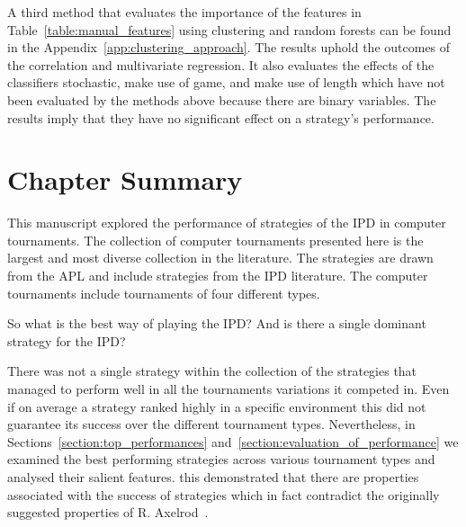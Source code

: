 A third method that evaluates the importance of the features in
Table~\ref{table:manual_features} using clustering and random forests can be found in
the Appendix~\ref{app:clustering_approach}. The results uphold the outcomes of the
correlation and multivariate regression. It also evaluates the effects
of the classifiers stochastic, make use of game, and make use of length which
have not been evaluated by the methods above because there are binary variables.
The results imply that they have no significant effect on a strategy's
performance. %

\section{Chapter Summary}\label{section:conclusion} %

This manuscript explored the performance of \numberofstrategies strategies of
the IPD in \numberofalltournaments computer tournaments. The collection of
computer tournaments presented here is the largest and most diverse collection in the
literature. The \numberofstrategies strategies are drawn from the APL and include
strategies from the IPD literature. The computer tournaments include tournaments of
four different types.

So what is the best way of playing the IPD? And is
there a single dominant strategy for the IPD? 

There was not a single strategy
within the collection of the \numberofstrategies strategies that managed to
perform well in all the tournaments variations it competed in. Even if on
average a strategy ranked highly in a specific environment this did not
guarantee its success over the different tournament types. Nevertheless, in
Sections~\ref{section:top_performances}
and~\ref{section:evaluation_of_performance} we examined the best performing
strategies across various tournament types and analysed their salient features.
this demonstrated that there are properties associated with the success of
strategies which in fact contradict the originally suggested properties of R.
Axelrod~\cite{Axelrod1981}.

